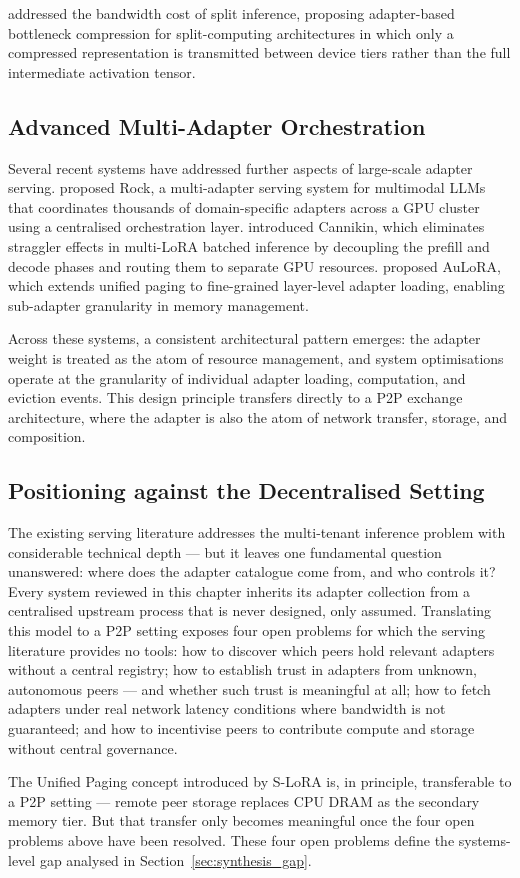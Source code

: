 \citet{HuDistributed2022} addressed the bandwidth cost of split inference, proposing
adapter-based bottleneck compression for split-computing architectures in which only
a compressed representation is transmitted between device tiers rather than the full
intermediate activation tensor.

\subsection{Advanced Multi-Adapter Orchestration}
\label{sec:inference_systems:advanced}

Several recent systems have addressed further aspects of large-scale adapter serving.
\citet{WuRock2025} proposed Rock, a multi-adapter serving system for multimodal LLMs
that coordinates thousands of domain-specific adapters across a GPU cluster using a
centralised orchestration layer. \citet{ZhuCannikin2025} introduced Cannikin, which
eliminates straggler effects in multi-LoRA batched inference by decoupling the prefill
and decode phases and routing them to separate GPU resources. \citet{Shi2025AuLoRA}
proposed AuLoRA, which extends unified paging to fine-grained layer-level adapter
loading, enabling sub-adapter granularity in memory management.

Across these systems, a consistent architectural pattern emerges: the adapter weight is
treated as the atom of resource management, and system optimisations operate at the
granularity of individual adapter loading, computation, and eviction events. This
design principle transfers directly to a P2P exchange architecture, where the adapter is also
the atom of network transfer, storage, and composition.

\subsection{Positioning against the Decentralised Setting}
\label{sec:inference_systems:gap}

The existing serving literature addresses the multi-tenant inference problem with considerable technical depth — but it leaves one fundamental question unanswered: where does the adapter catalogue come from, and who controls it? Every system reviewed in this chapter inherits its adapter collection from a centralised upstream process that is never designed, only assumed.
Translating this model to a P2P setting exposes four open problems for which the serving literature provides no tools: how to discover which peers hold relevant adapters without a central registry; how to establish trust in adapters from unknown, autonomous peers — and whether such trust is meaningful at all; how to fetch adapters under real network latency conditions where bandwidth is not guaranteed; and how to incentivise peers to contribute compute and storage without central governance.

The Unified Paging concept introduced by S-LoRA is, in principle, transferable to a P2P setting — remote peer storage replaces CPU DRAM as the secondary memory tier. But that transfer only becomes meaningful once the four open problems above have been resolved.
These four open problems define the systems-level gap analysed in Section~\ref{sec:synthesis_gap}.
